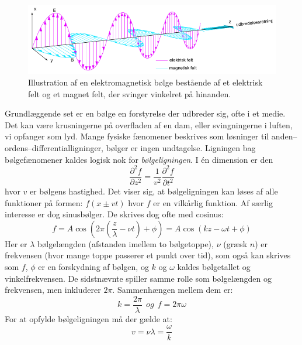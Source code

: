 \begin{figure}[h!]
  \centering
  \includegraphics[width=\textwidth]{Elektrodynamik/EMbolge.png}
  \caption{Illustration af en elektromagnetisk bølge bestående af et elektrisk felt og et magnet felt, der svinger vinkelret på hinanden.}
  \label{fig:elektromagbolge}
\end{figure}

Grundlæggende set er en bølge en forstyrelse der udbreder sig, ofte i et medie. Det kan være krusningerne på overfladen af en dam, eller svingningerne i luften, vi opfanger som lyd. Mange fysiske fænomener beskrives som løsninger til anden--ordens--differentialligninger, bølger er ingen undtagelse. Ligningen bag bølgefænomener kaldes logisk nok for \emph{bølgeligningen}. I én dimension er den
\begin{equation}
\frac{\partial^2 f}{\partial z^2} = \frac{1}{v^2}\frac{\partial^2 f}{\partial t^2}
\label{eq:bolgeligning}
\end{equation}
hvor $v$ er bølgens hastighed. Det viser sig, at bølgeligningen kan løses af alle funktioner på formen: $f(x\pm vt)$ hvor $f$ er en vilkårlig funktion. Af særlig interesse er dog sinusbølger. De skrives dog ofte med cosinus:
\begin{equation}
f = A\cos\left(2\pi\left(\frac{z}{\lambda} - \nu t\right)+\phi\right) = A\cos\left( kz-\omega t+\phi\right)
\end{equation}
Her er $\lambda$ bølgelængden (afstanden imellem to bølgetoppe), $\nu$ (græsk $n$) er frekvensen (hvor mange toppe passerer et punkt over tid), som også kan skrives som $f$, $\phi$ er en forskydning af bølgen, og $k$ og $\omega$ kaldes bølgetallet og vinkelfrekvensen. De sidstnævnte spiller samme rolle som bølgelængden og frekvensen, men inkluderer $2\pi$. Sammenhængen mellem dem er: $$k=\frac{2\pi}{\lambda}~~ og ~~f = 2\pi\omega$$ For at opfylde bølgeligningen må der gælde at:
\begin{equation}
v = \nu\lambda = \frac{\omega}{k}
\end{equation}

